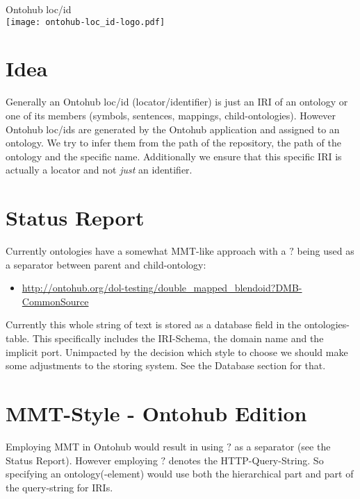 \documentclass[a4paper,11pt,DIV=25]{scrartcl}
\author{Tim Reddehase}
\date{2014-09-09}
\begin{document}
\Huge
\begin{center}
  Ontohub loc/id\\
  \bigskip
  \texttt{[image: ontohub-loc\_id-logo.pdf]}
\end{center}
\normalsize

\bigskip

\section{Idea}

Generally an Ontohub loc/id (locator/identifier) is just an IRI of an ontology
or one of its members (symbols, sentences, mappings, child-ontologies). However
Ontohub loc/ids are generated by the Ontohub application and assigned to an
ontology.  We try to infer them from the path of the repository, the path of
the ontology and the specific name. Additionally we ensure that this specific
IRI is actually a locator and not \textit{just} an identifier.

\section{Status Report}

Currently ontologies have a somewhat MMT-like approach with a $?$ being used as
a separator between parent and child-ontology:

\begin{itemize}
  \item \url{http://ontohub.org/dol-testing/double_mapped_blendoid?DMB-CommonSource}
\end{itemize}

Currently this whole string of text is stored as a database field in the
ontologies-table.  This specifically includes the IRI-Schema, the domain name
and the implicit port. Unimpacted by the decision which style to choose we
should make some adjustments to the storing system. See the Database section
for that.

\pagebreak

\section{MMT-Style - Ontohub Edition}

Employing MMT in Ontohub would result in using $?$ as a separator (see the
Status Report).  However employing $?$ denotes the HTTP-Query-String. So
specifying an ontology(-element) would use both the hierarchical part and part
of the query-string for IRIs.
\end{document}
